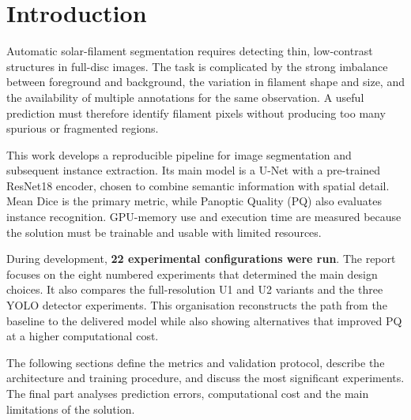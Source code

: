 \section{Introduction}
\label{sec:intro}

Automatic solar-filament segmentation requires detecting thin, low-contrast structures
in full-disc images. The task is complicated by the strong imbalance between foreground
and background, the variation in filament shape and size, and the availability of
multiple annotations for the same observation. A useful prediction must therefore
identify filament pixels without producing too many spurious or fragmented regions.

This work develops a reproducible pipeline for image segmentation and subsequent
instance extraction. Its main model is a U-Net with a pre-trained ResNet18 encoder,
chosen to combine semantic information with spatial detail. Mean Dice is the primary
metric, while Panoptic Quality (PQ) also evaluates instance recognition. GPU-memory use
and execution time are measured because the solution must be trainable and usable with
limited resources.

During development, \textbf{22 experimental configurations were run}. The report focuses
on the eight numbered experiments that determined the main design choices. It also compares the
full-resolution U1 and U2 variants and the three YOLO detector experiments. This
organisation reconstructs the path from the baseline to the delivered model while also
showing alternatives that improved PQ at a higher computational cost.

The following sections define the metrics and validation protocol, describe the
architecture and training procedure, and discuss the most significant experiments. The
final part analyses prediction errors, computational cost and the main limitations of
the solution.
